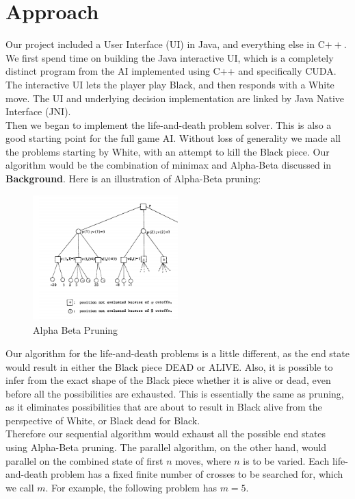 \documentclass[11pt]{article}
\begin{document}
\section*{Approach}
Our project included a User Interface (UI) in Java, and everything else in C$++$. We first spend time on building the Java interactive UI, which is a completely distinct program from the AI implemented using C++ and specifically CUDA. The interactive UI lets the player play Black, and then responds with a White move. The UI and underlying decision implementation are linked by Java Native Interface (JNI). \\
Then we began to implement the life-and-death problem solver. This is also a good starting point for the full game AI. Without loss of generality we made all the problems starting by White, with an attempt to kill the Black piece. Our algorithm would be the combination of minimax and Alpha-Beta discussed in \textbf{Background}. Here is an illustration of Alpha-Beta pruning:
\begin{figure}[H]
    \centering
    \includegraphics[width=0.5\textwidth]{Alpha_Beta.png}
    \caption{Alpha Beta Pruning \cite{AB}}
\end{figure}
Our algorithm for the life-and-death problems is a little different, as the end state would result in either the Black piece DEAD or ALIVE. Also, it is possible to infer from the exact shape of the Black piece whether it is alive or dead, even before all the possibilities are exhausted. This is essentially the same as pruning, as it eliminates possibilities that are about to result in Black alive from the perspective of White, or Black dead for Black. \\
Therefore our sequential algorithm would exhaust all the possible end states using Alpha-Beta pruning. The parallel algorithm, on the other hand, would parallel on the combined state of first $n$ moves, where $n$ is to be varied. Each life-and-death problem has a fixed finite number of crosses to be searched for, which we call $m$. For example, the following problem has $m = 5$. 
\end{document}
